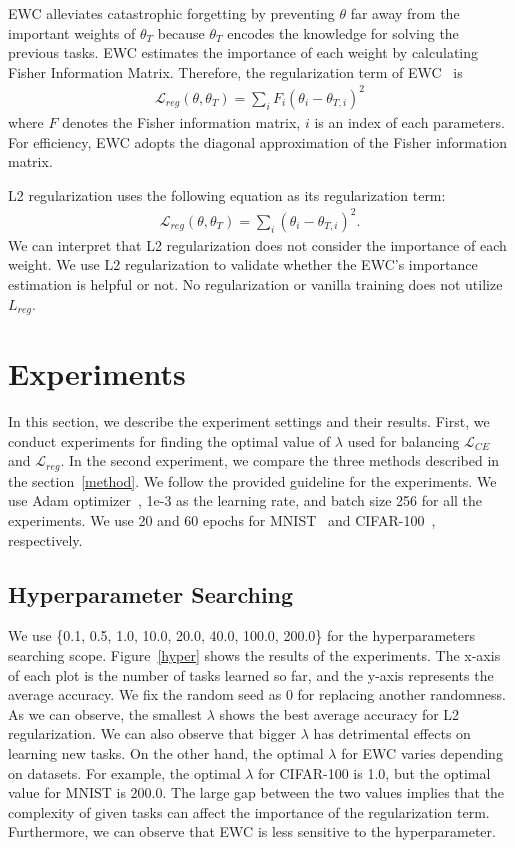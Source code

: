 \documentclass[final]{cvpr}
\begin{document}
EWC alleviates catastrophic forgetting by preventing $\theta$ far away from the important weights of $\theta_{T}$ because $\theta_{T}$ encodes the knowledge for solving the previous tasks. EWC estimates the importance of each weight by calculating Fisher Information Matrix. Therefore, the regularization term of EWC~\cite{ewc} is 
\begin{align}
	\mathcal{L}_{reg}(\theta, \theta_T) = \sum_i F_i(\theta_i - \theta_{T,i})^2
\end{align}
where $F$ denotes the Fisher information matrix, $i$ is an index of each parameters. For efficiency, EWC adopts the diagonal approximation of the Fisher information matrix.

L2 regularization uses the following equation as its regularization term:
\begin{align}
	\mathcal{L}_{reg}(\theta, \theta_T) = \sum_i(\theta_i - \theta_{T,i})^2.
\end{align}
We can interpret that L2 regularization does not consider the importance of each weight. We use L2 regularization to validate whether the EWC's importance estimation is helpful or not. No regularization or vanilla training does not utilize $L_{reg}$. 

\section{Experiments}
In this section, we describe the experiment settings and their results. First, we conduct experiments for finding the optimal value of $\lambda$ used for balancing $\mathcal{L}_{CE}$ and $\mathcal{L}_{reg}$. In the second experiment, we compare the three methods described in the section~\ref{method}. We follow the provided guideline for the experiments. We use Adam optimizer~\cite{adam}, 1e-3 as the learning rate, and batch size 256 for all the experiments. We use 20 and 60 epochs for MNIST~\cite{mnist} and CIFAR-100~\cite{cifar}, respectively. 

\subsection{Hyperparameter Searching}
We use \{0.1, 0.5, 1.0, 10.0, 20.0, 40.0, 100.0, 200.0\} for the hyperparameters searching scope. Figure~\ref{hyper} shows the results of the experiments. The x-axis of each plot is the number of tasks learned so far, and the y-axis represents the average accuracy.  We fix the random seed as 0 for replacing another randomness. As we can observe, the smallest $\lambda$ shows the best average accuracy for L2 regularization. We can also observe that bigger $\lambda$ has detrimental effects on learning new tasks.
On the other hand, the optimal $\lambda$ for EWC varies depending on datasets. For example, the optimal $\lambda$ for CIFAR-100 is 1.0, but the optimal value for MNIST is 200.0. The large gap between the two values implies that the complexity of given tasks can affect the importance of the regularization term. Furthermore, we can observe that EWC is less sensitive to the hyperparameter. 
\end{document}
